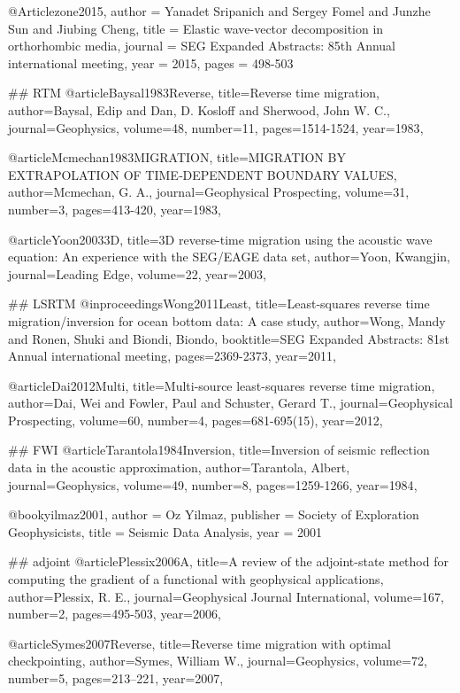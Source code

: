 {@Article{zone2015,
  author = 	 {Yanadet Sripanich and Sergey Fomel and Junzhe Sun and Jiubing Cheng},
  title = 	 {Elastic wave-vector decomposition in orthorhombic media},
  journal = 	 {SEG Expanded Abstracts: 85th Annual international meeting},
  year = 	 2015,
  pages =	 {498-503}
}


## RTM
@article{Baysal1983Reverse,
  title={Reverse time migration},
  author={Baysal, Edip and Dan, D. Kosloff and Sherwood, John W. C.},
  journal={Geophysics},
  volume={48},
  number={11},
  pages={1514-1524},
  year={1983},
}

@article{Mcmechan1983MIGRATION,
  title={MIGRATION BY EXTRAPOLATION OF TIME‐DEPENDENT BOUNDARY VALUES},
  author={Mcmechan, G. A.},
  journal={Geophysical Prospecting},
  volume={31},
  number={3},
  pages={413-420},
  year={1983},
}

@article{Yoon20033D,
  title={3{D} reverse-time migration using the acoustic wave equation: An experience with the SEG/EAGE data set},
  author={Yoon, Kwangjin},
  journal={Leading Edge},
  volume={22},
  year={2003},
}

## LSRTM
@inproceedings{Wong2011Least,
  title={Least‐squares reverse time migration/inversion for ocean bottom data: A case study},
  author={Wong, Mandy and Ronen, Shuki and Biondi, Biondo},
  booktitle={SEG Expanded Abstracts: 81st Annual international meeting},
  pages={2369-2373},
  year={2011},
}

@article{Dai2012Multi,
  title={Multi-source least-squares reverse time migration},
  author={Dai, Wei and Fowler, Paul and Schuster, Gerard T.},
  journal={Geophysical Prospecting},
  volume={60},
  number={4},
  pages={681-695(15)},
  year={2012},
}

## FWI
@article{Tarantola1984Inversion,
  title={Inversion of seismic reflection data in the acoustic approximation},
  author={Tarantola, Albert},
  journal={Geophysics},
  volume={49},
  number={8},
  pages={1259-1266},
  year={1984},
}

@book{yilmaz2001,
   author = {Oz Yilmaz},
   publisher = {Society of Exploration Geophysicists},
   title = {Seismic Data Analysis},
   year = {2001}
}

## adjoint
@article{Plessix2006A,
  title={A review of the adjoint-state method for computing the gradient of a functional with geophysical applications},
  author={Plessix, R. E.},
  journal={Geophysical Journal International},
  volume={167},
  number={2},
  pages={495-503},
  year={2006},
}

@article{Symes2007Reverse,
  title={Reverse time migration with optimal checkpointing},
  author={Symes, William W.},
  journal={Geophysics},
  volume={72},
  number={5},
  pages={213--221},
  year={2007},
}


}

